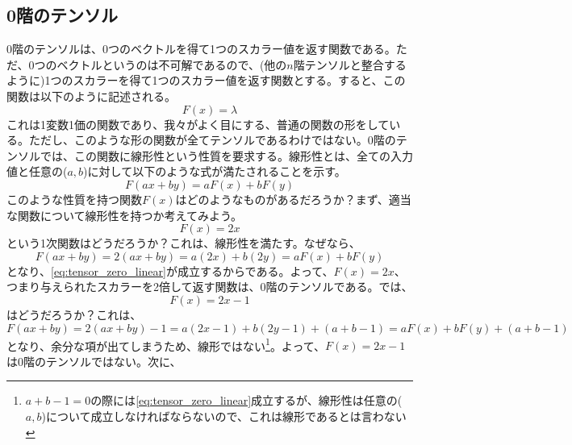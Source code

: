 \subsection{0階のテンソル}
0階のテンソルは、0つのベクトルを得て1つのスカラー値を返す関数である。ただ、0つのベクトルというのは不可解であるので、(他の\(n\)階テンソルと整合するように)1つのスカラーを得て1つのスカラー値を返す関数とする。すると、この関数は以下のように記述される。
\begin{equation}
	F(x)=\lambda
\end{equation}
これは1変数1価の関数であり、我々がよく目にする、普通の関数の形をしている。ただし、このような形の関数が全てテンソルであるわけではない。0階のテンソルでは、この関数に線形性という性質を要求する。線形性とは、全ての入力値と任意の(\(a,b\))に対して以下のような式が満たされることを示す。
\begin{equation}
	F(ax+by)=aF(x)+bF(y)
	\label{eq:tensor_zero_linear}
\end{equation}
このような性質を持つ関数\(F(x)\)はどのようなものがあるだろうか？まず、適当な関数について線形性を持つか考えてみよう。
\begin{equation}
	F(x)=2x
\end{equation}
という1次関数はどうだろうか？これは、線形性を満たす。なぜなら、
\begin{equation}
	F(ax+by)=2(ax+by)=a(2x)+b(2y)=aF(x)+bF(y)
\end{equation}
となり、\autoref{eq:tensor_zero_linear}が成立するからである。よって、\(F(x)=2x\)、つまり与えられたスカラーを2倍して返す関数は、0階のテンソルである。では、
\begin{equation}
	F(x)=2x-1
\end{equation}
はどうだろうか？これは、
\begin{equation}
	F(ax+by)=2(ax+by)-1=a(2x-1)+b(2y-1)+(a+b-1)=aF(x)+bF(y)+(a+b-1)
\end{equation}
となり、余分な項が出てしまうため、線形ではない\footnote{\(a+b-1=0\)の際には\autoref{eq:tensor_zero_linear}成立するが、線形性は任意の(\(a,b\))について成立しなければならないので、これは線形であるとは言わない}。よって、\(F(x)=2x-1\)は0階のテンソルではない。次に、

